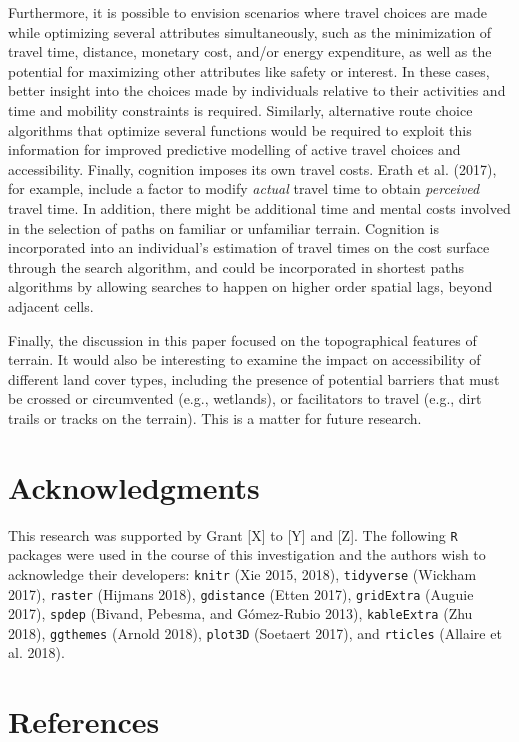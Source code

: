 \documentclass[]{elsarticle} %
\begin{document}
Furthermore, it is possible to envision scenarios where travel choices
are made while optimizing several attributes simultaneously, such as the
minimization of travel time, distance, monetary cost, and/or energy
expenditure, as well as the potential for maximizing other attributes
like safety or interest. In these cases, better insight into the choices
made by individuals relative to their activities and time and mobility
constraints is required. Similarly, alternative route choice algorithms
that optimize several functions would be required to exploit this
information for improved predictive modelling of active travel choices
and accessibility. Finally, cognition imposes its own travel costs.
Erath et al. (2017), for example, include a factor to modify
\emph{actual} travel time to obtain \emph{perceived} travel time. In
addition, there might be additional time and mental costs involved in
the selection of paths on familiar or unfamiliar terrain. Cognition is
incorporated into an individual's estimation of travel times on the cost
surface through the search algorithm, and could be incorporated in
shortest paths algorithms by allowing searches to happen on higher order
spatial lags, beyond adjacent cells.

Finally, the discussion in this paper focused on the topographical
features of terrain. It would also be interesting to examine the impact
on accessibility of different land cover types, including the presence
of potential barriers that must be crossed or circumvented (e.g.,
wetlands), or facilitators to travel (e.g., dirt trails or tracks on the
terrain). This is a matter for future research.

\hypertarget{acknowledgments}{%
\section{Acknowledgments}\label{acknowledgments}}

This research was supported by Grant {[}X{]} to {[}Y{]} and {[}Z{]}. The
following \texttt{R} packages were used in the course of this
investigation and the authors wish to acknowledge their developers:
\texttt{knitr} (Xie 2015, 2018), \texttt{tidyverse} (Wickham 2017),
\texttt{raster} (Hijmans 2018), \texttt{gdistance} (Etten 2017),
\texttt{gridExtra} (Auguie 2017), \texttt{spdep} (Bivand, Pebesma, and
Gómez-Rubio 2013), \texttt{kableExtra} (Zhu 2018), \texttt{ggthemes}
(Arnold 2018), \texttt{plot3D} (Soetaert 2017), and \texttt{rticles}
(Allaire et al. 2018).

\hypertarget{references}{%
\section*{References}\label{references}}
\end{document}
